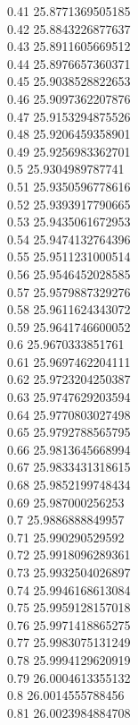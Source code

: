 {0.41	25.8771369505185\\
0.42	25.8843226877637\\
0.43	25.8911605669512\\
0.44	25.8976657360371\\
0.45	25.9038528822653\\
0.46	25.9097362207876\\
0.47	25.9153294875526\\
0.48	25.9206459358901\\
0.49	25.9256983362701\\
0.5	25.9304989787741\\
0.51	25.9350596778616\\
0.52	25.9393917790665\\
0.53	25.9435061672953\\
0.54	25.9474132764396\\
0.55	25.9511231000514\\
0.56	25.9546452028585\\
0.57	25.9579887329276\\
0.58	25.9611624343072\\
0.59	25.9641746600052\\
0.6	25.9670333851761\\
0.61	25.9697462204111\\
0.62	25.9723204250387\\
0.63	25.9747629203594\\
0.64	25.9770803027498\\
0.65	25.9792788565795\\
0.66	25.9813645668994\\
0.67	25.9833431318615\\
0.68	25.9852199748434\\
0.69	25.987000256253\\
0.7	25.9886888849957\\
0.71	25.990290529592\\
0.72	25.9918096289361\\
0.73	25.9932504026897\\
0.74	25.9946168613084\\
0.75	25.9959128157018\\
0.76	25.9971418865275\\
0.77	25.9983075131249\\
0.78	25.9994129620919\\
0.79	26.0004613355132\\
0.8	26.0014555788456\\
0.81	26.0023984884708\\
}
